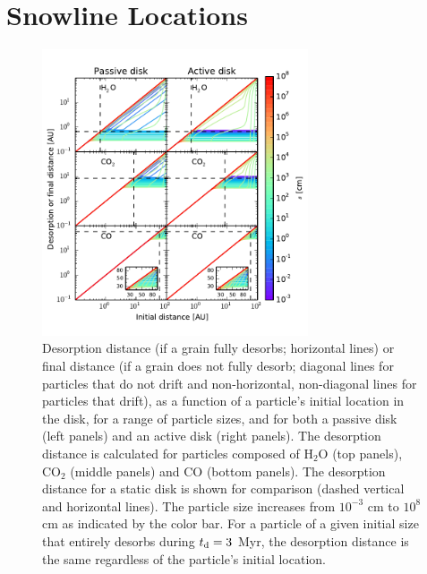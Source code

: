 \documentclass[apj]{emulateapj}
\begin{document}
\section{Snowline Locations}
\label{sec:snowlines}

\begin{figure}[tb]
\centering
\includegraphics[width=0.7\textwidth]{desorption_distance_passive_active_colorbar_test2.pdf}
\caption{Desorption distance (if a grain fully desorbs; horizontal lines) or final distance (if a grain does not fully desorb; diagonal lines for particles that do not drift and non-horizontal, non-diagonal lines for particles that drift), as a function of a particle's initial location in the disk, for a range of particle sizes, and for both a passive disk (left panels) and an active disk (right panels). The desorption distance is calculated for particles composed of H$_2$O (top panels), CO$_2$ (middle panels) and CO (bottom panels). The desorption distance for a static disk is shown for comparison (dashed vertical and horizontal lines). The particle size increases from $10^{-3}$ cm to $10^8$ cm as indicated by the color bar. For a particle of a given initial size that entirely desorbs during $t_{\rm d}=3$ Myr, the desorption distance is the same regardless of the particle's initial location.} 
\label{fig:snowlines}
\end{figure}
\end{document}
